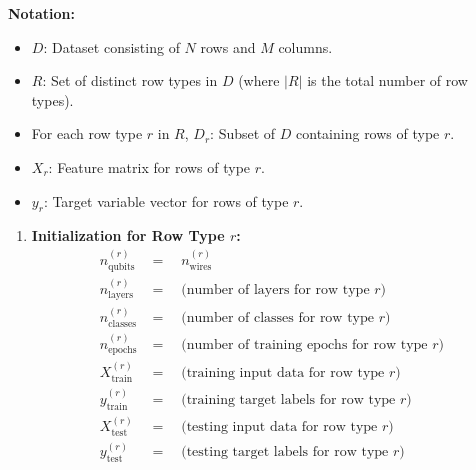 \documentclass[a4paper]{article}
\begin{document}
\textbf{Notation:}
\begin{itemize}
		\item[] $D$: Dataset consisting of $N$ rows and $M$ columns.
		\item[] $R$: Set of distinct row types in $D$ (where $|R|$ is the total number of row types).
		\item[] For each row type $r$ in $R$, $D_r$: Subset of $D$ containing rows of type $r$.
		\item[] $X_r$: Feature matrix for rows of type $r$.
		\item[] $y_r$: Target variable vector for rows of type $r$.
\end{itemize}		
\begin{enumerate}[label=\arabic*.]
		
		\item \textbf{Initialization for Row Type $r$:}
	\begin{align*}
			n_{\text{qubits}}^{(r)} &=\quad n_{\text{wires}}^{(r)} \\
			n_{\text{layers}}^{(r)} &=\quad \text{(number of layers for row type }r\text{)} \\
			n_{\text{classes}}^{(r)} &= \quad \text{(number of classes for row type } r\text{)} \\
			n_{\text{epochs}}^{(r)} &= \quad \text{(number of training epochs for row type } r\text{)} \\
			X_{\text{train}}^{(r)} &= \quad \text{(training input data for row type } r\text{)} \\
			y_{\text{train}}^{(r)} &= \quad \text{(training target labels for row type } r\text{)} \\
			X_{\text{test}}^{(r)} &= \quad \text{(testing input data for row type } r\text{)} \\
			y_{\text{test}}^{(r)} &= \quad \text{(testing target labels for row type } r\text{)} 
	\end{align*}
			

\end{enumerate}
\end{document}
